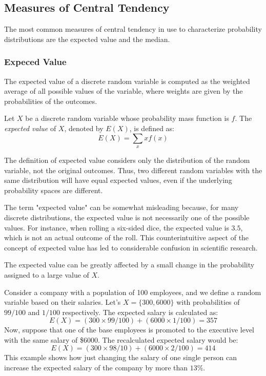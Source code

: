 \subsection{Measures of Central Tendency}

The most common measures of central tendency in use to characterize probability distributions are the expected value and the median.

\subsubsection*{Expeced Value}

The expected value of a discrete random variable is computed as the weighted average of all possible values of the variable, where weights are given by the probabilities of the outcomes.

\begin{definition}\label{probability:expectation}
Let $X$ be a discrete random variable whose probability mass function is $f$. The \emph{expected value} of $X$, denoted by $E\left(X\right)$, is defined as:
\[
E\left(X\right)=\sum_{x}xf\left(x\right)
\]
\end{definition}

The definition of expected value considers only the distribution of the random variable, not the original outcomes. Thus, two different random variables with the same distribution will have equal expected values, even if the underlying probability spaces are different.

The term "expected value" can be somewhat misleading because, for many discrete distributions, the expected value is not necessarily one of the possible values. For instance, when rolling a six-sided dice, the expected value is \(3.5\), which is not an actual outcome of the roll. This counterintuitive aspect of the concept of expected value has led to considerable confusion in scientific research.

The expected value can be greatly affected by a small change in the probability assigned to a large value of $X$.

\begin{example}
Consider a company with a population of 100 employees, and we define a random variable based on their salaries. Let's $X = \{300, 6000\}$ with probabilities of $99/100$ and $1/100$ respectively. The expected salary is calculated as:
\[ 
E\left(X\right) = (300 \times 99/100) + (6000 \times 1/100) = 357
\]
Now, suppose that one of the base employees is promoted to the executive level with the same salary of \$6000. The recalculated expected salary would be:
\[
E\left(X\right) = (300 \times 98/10) + (6000 \times 2/100) = 414
\]
This example shows how just changing the salary of one single person can increase the expected salary of the company by more than $13\%$.
\end{example}

